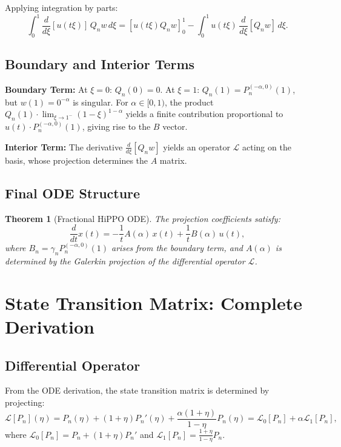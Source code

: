 \documentclass{article}
\theoremstyle{plain}
\newtheorem{theorem}{Theorem}[section]
\theoremstyle{definition}
\theoremstyle{remark}
\begin{document}
Applying integration by parts:
\begin{equation}
	\int_0^1 \frac{d}{d\xi}[u(t\xi)] \, Q_n w \, d\xi = \left[u(t\xi) Q_n w\right]_0^1 - \int_0^1 u(t\xi) \, \frac{d}{d\xi}[Q_n w] \, d\xi.
\end{equation}

\subsection{Boundary and Interior Terms}

\textbf{Boundary Term:} At $\xi = 0$: $Q_n(0) = 0$. At $\xi = 1$: $Q_n(1) = P_n^{(-\alpha,0)}(1)$, but $w(1) = 0^{-\alpha}$ is singular. For $\alpha \in [0,1)$, the product $Q_n(1) \cdot \lim_{\xi \to 1^-}(1-\xi)^{1-\alpha}$ yields a finite contribution proportional to $u(t) \cdot P_n^{(-\alpha,0)}(1)$, giving rise to the $B$ vector.

\textbf{Interior Term:} The derivative $\frac{d}{d\xi}[Q_n w]$ yields an operator $\mathcal{L}$ acting on the basis, whose projection determines the $A$ matrix.

\subsection{Final ODE Structure}

\begin{theorem}[Fractional HiPPO ODE]
	\label{thm:fractal_ode}
	The projection coefficients satisfy:
	\begin{equation}
		\frac{d}{dt} x(t) = -\frac{1}{t} A(\alpha) \, x(t) + \frac{1}{t} B(\alpha) \, u(t),
	\end{equation}
	where $B_n = \gamma_n P_n^{(-\alpha, 0)}(1)$ arises from the boundary term, and $A(\alpha)$ is determined by the Galerkin projection of the differential operator $\mathcal{L}$.
\end{theorem}

\section{State Transition Matrix: Complete Derivation}
\label{app:A_matrix_proof}

\subsection{Differential Operator}

From the ODE derivation, the state transition matrix is determined by projecting:
\begin{equation}
	\mathcal{L}[P_n](\eta) = P_n(\eta) + (1+\eta) P_n'(\eta) + \frac{\alpha(1+\eta)}{1-\eta} P_n(\eta) = \mathcal{L}_0[P_n] + \alpha \mathcal{L}_1[P_n],
\end{equation}
where $\mathcal{L}_0[P_n] = P_n + (1+\eta) P_n'$ and $\mathcal{L}_1[P_n] = \frac{1+\eta}{1-\eta} P_n$.
\end{document}
